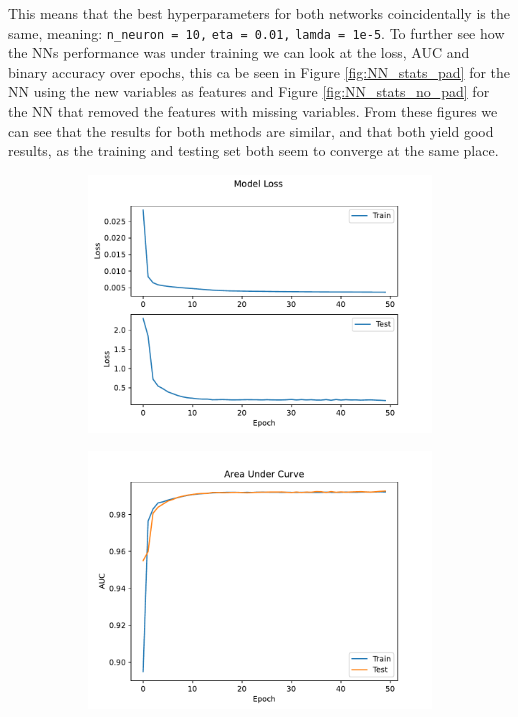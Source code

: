 \documentclass[12pt, a4paper]{book}
\begin{document}
\newpage\noindent This means that the best hyperparameters for both networks coincidentally is the same, meaning: \verb|n_neuron = 10,| \verb|eta = 0.01,| \verb|lamda = 1e-5|. 
To further see how the NNs performance was under training we can look at the loss, AUC and binary accuracy over epochs, this ca be seen in Figure \ref{fig:NN_stats_pad} for the NN using the new variables as features 
and Figure \ref{fig:NN_stats_no_pad} for the NN that removed the features with missing variables. From these figures we can see that the results for both methods are similar, and that both yield good results, 
as the training and testing set both seem to converge at the same place.
\begin{figure}[!ht]
	\centering
	\begin{subfigure}[b]{0.49\textwidth}
      \centering
      \includegraphics[width=1\textwidth]{New_pad/Loss.pdf}
   \end{subfigure}
   \hfill
	\begin{subfigure}[b]{0.49\textwidth}
      \centering
      \includegraphics[width=1\textwidth]{New_pad/AUC.pdf}

\end{subfigure}
\end{figure}
\end{document}
